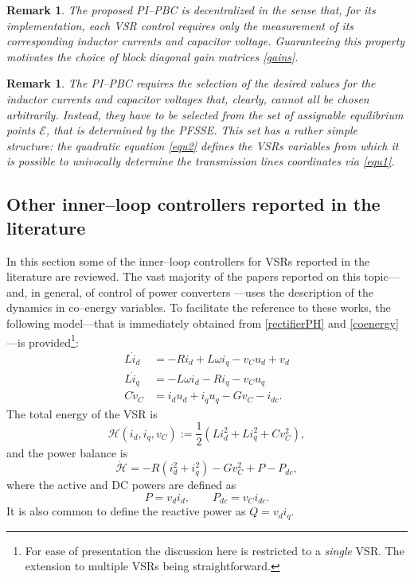 \documentclass[5p,twocolumn]{elsarticle}
\def\begequ{\begin{equation}}
\def\endequ{\end{equation}}
\def\lab{\label}
\def\begrem{\begin{remark}\rm}
\def\endrem{\end{remark}}
\newtheorem{remark}[theorem]{Remark}
\numberwithin{equation}{section}
\begin{document}
\begrem
The proposed PI--PBC is decentralized in the sense that, for its implementation, each VSR control requires only the measurement of its corresponding inductor currents and capacitor voltage. Guaranteeing this property motivates the choice of block diagonal gain matrices \eqref{gains}.
\endrem

\begrem
The PI--PBC requires the selection of the desired values for the inductor currents and capacitor voltages that, clearly, cannot all be chosen arbitrarily. Instead, they have to be selected from the set of
assignable equilibrium points $\mathcal{E}$, that is determined by the {PFSSE}.  This set has a rather simple structure: the quadratic equation \eqref{equ2} defines the VSRs variables from which it is possible to {\em
univocally} determine the transmission lines coordinates via \eqref{equ1}.
\endrem
\subsection{Other inner--loop controllers reported in the literature}
\label{liter}
In this section some of the inner--loop controllers for VSRs reported in the literature are reviewed. The vast majority of the papers reported on this topic---and, in general, of control of power converters
\cite{kazm,pinto}---uses the description of the dynamics in co--energy variables. To facilitate the reference to these works, the following model---that is immediately
obtained from \eqref{rectifierPH} and \eqref{coenergy}---is provided\footnote{For ease of presentation the discussion here is restricted to a {\em single} VSR. The extension to multiple VSRs being straightforward.}:
\begin{equation}
\label{sysiv}
\begin{aligned}
L\dot{i}_d&=-Ri_d+L\omega i_q-v_Cu_d+v_d\\
L\dot{i}_q&=-L\omega i_d-Ri_q-v_Cu_q\\
C\dot{v}_C&=i_du_d+i_qu_q-Gv_C-i_{dc}.
\end{aligned}
\end{equation}
The total energy of the VSR is
$$
\mathcal H(i_d,i_q,v_C):=\frac{1}{2}\left( L{i}^2_d+L i^2_q+ Cv^2_C \right),
$$
and the power balance is
\begequ
\lab{powbalvsr}
\dot{\mathcal H} = -R(i^2_d+i^2_q)-Gv^2_C+P-P_{dc},
\endequ
where the active and DC powers are defined as
\begin{equation}\label{power}
P=v_di_d, \qquad P_{dc}=v_Ci_{dc}.
\end{equation}
It is also common to define the reactive power as $Q=v_di_q$.
\end{document}
